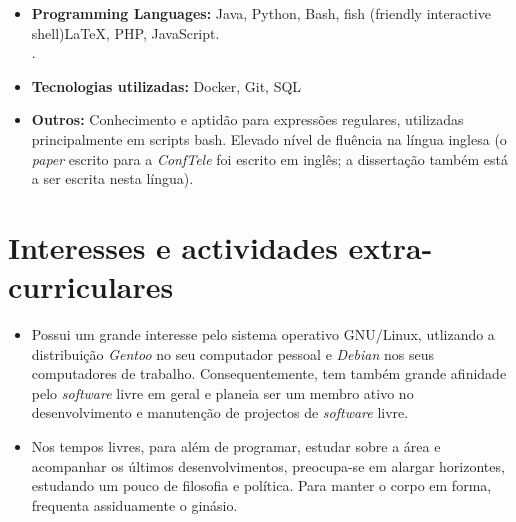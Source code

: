 \documentclass[11pt,a4paper,sans]{moderncv} %
\begin{document}
\begin{itemize}

\item \textbf{Programming Languages:} Java, Python, Bash, fish
  (friendly interactive shell)LaTeX, PHP, JavaScript. \\.

\vspace{6pt}

\item \textbf{Tecnologias utilizadas:} Docker, Git, SQL

\vspace{6pt}

\item \textbf{Outros: } Conhecimento e aptidão para expressões regulares,
  utilizadas principalmente em scripts bash. Elevado nível de fluência na língua
  inglesa (o \textit{paper} escrito para a \textit{ConfTele} foi escrito em
  inglês; a dissertação também está a ser escrita nesta língua).

\end{itemize}

\section{Interesses e actividades extra-curriculares}

\vspace{6pt}

\begin{itemize}

\item{Possui um grande interesse pelo sistema operativo GNU/Linux, utlizando a
    distribuição \textit{Gentoo} no seu computador pessoal e \textit{Debian} nos
    seus computadores de trabalho.  Consequentemente, tem também grande
    afinidade pelo \textit{software} livre em geral e planeia ser um membro
    ativo no desenvolvimento e manutenção de projectos de \textit{software}
    livre.}

\vspace{6pt}

\item{Nos tempos livres, para além de programar, estudar sobre a área e
    acompanhar os últimos desenvolvimentos, preocupa-se em alargar horizontes,
    estudando um pouco de filosofia e política. Para manter o corpo em forma,
    frequenta assiduamente o ginásio.}

\end{itemize}


\nocite{*}

\end{document}
